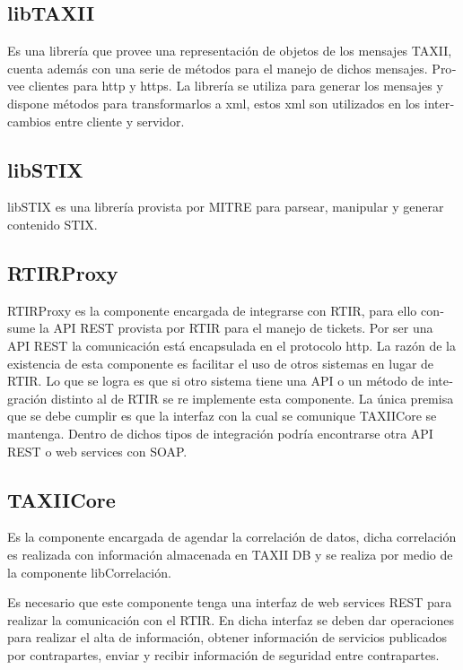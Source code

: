 \documentclass[11pt]{article}
\begin{document}
\bigskip

\subsection[libTAXII]{\foreignlanguage{spanish}{libTAXII}}

\bigskip

\foreignlanguage{spanish}{Es una librería que provee una representación de objetos de los mensajes TAXII, cuenta además
con una serie de métodos para el manejo de dichos mensajes. Provee clientes para http y https. La librería se utiliza
para generar los mensajes y dispone métodos para transformarlos a xml, estos xml son utilizados en los intercambios
entre cliente y servidor.}

\subsection[libSTIX]{\foreignlanguage{spanish}{libSTIX}}
\foreignlanguage{spanish}{libSTIX es una librería provista por MITRE para parsear, manipular y generar contenido STIX.}

\subsection[RTIRProxy]{\foreignlanguage{spanish}{RTIRProxy}}
\foreignlanguage{spanish}{RTIRProxy es la componente encargada de integrarse con RTIR, para ello consume la API REST
provista por RTIR para el manejo de tickets. Por ser una API REST la comunicación está encapsulada en el protocolo
http. La razón de la existencia de esta componente es facilitar el uso de otros sistemas en lugar de RTIR. Lo que se
logra es que si otro sistema tiene una API o un método de integración distinto al de RTIR se re implemente esta
componente. La única premisa que se debe cumplir es que la interfaz con la cual se comunique TAXIICore se mantenga.
Dentro de dichos tipos de integración podría encontrarse otra API REST o web services con SOAP. }

\subsection[TAXIICore]{\foreignlanguage{spanish}{TAXIICore}}
\foreignlanguage{spanish}{Es la componente encargada de agendar la correlación de datos, dicha correlación es realizada
con información almacenada en TAXII DB y se realiza por medio de la componente libCorrelación. }

\foreignlanguage{spanish}{Es necesario que este componente tenga una interfaz de web services REST para realizar la
comunicación con el RTIR. En dicha interfaz se deben dar operaciones para realizar el alta de información, obtener
información de servicios publicados por contrapartes, enviar y recibir información de seguridad entre contrapartes.}
\end{document}

